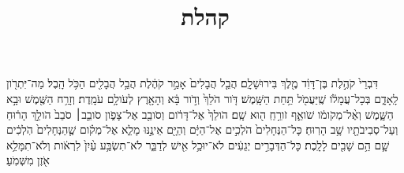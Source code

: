 \documentclass{openreader}
\title{קהלת}
\date{}
\begin{document}
\maketitle
\raggedbottom 
\fontsize{16pt}{24pt}\selectfont


דִּבְרֵי֙ קֹהֶ֣לֶת בֶּן־דָּוִ֔ד מֶ֖לֶךְ בִּירוּשָׁלִָֽם׃ 
הֲבֵ֤ל הֲבָלִים֙ אָמַ֣ר קֹהֶ֔לֶת הֲבֵ֥ל הֲבָלִ֖ים הַכֹּ֥ל הָֽבֶל׃ 
מַה־יִּתְרֹ֖ון לָֽאָדָ֑ם בְּכָל־עֲמָלֹ֔ו שֶֽׁיַּעֲמֹ֖ל תַּ֥חַת הַשָּֽׁמֶשׁ׃ 
דֹּ֤ור הֹלֵךְ֙ וְדֹ֣ור בָּ֔א וְהָאָ֖רֶץ לְעֹולָ֥ם עֹמָֽדֶת׃ 
וְזָרַ֥ח הַשֶּׁ֖מֶשׁ וּבָ֣א הַשָּׁ֑מֶשׁ וְאֶ֨ל־מְקֹומֹ֔ו שֹׁואֵ֛ף זֹורֵ֥חַֽ ה֖וּא שָֽׁם׃ 
הֹולֵךְ֙ אֶל־דָּרֹ֔ום וְסֹובֵ֖ב אֶל־צָפֹ֑ון סֹובֵ֤ב׀ סֹבֵב֙ הֹולֵ֣ךְ הָר֔וּחַ וְעַל־סְבִיבֹתָ֖יו שָׁ֥ב הָרֽוּחַ׃ 
כָּל־הַנְּחָלִים֙ הֹלְכִ֣ים אֶל־הַיָּ֔ם וְהַיָּ֖ם אֵינֶ֣נּוּ מָלֵ֑א אֶל־מְקֹ֗ום שֶׁ֤הַנְּחָלִים֙ הֹֽלְכִ֔ים שָׁ֛ם הֵ֥ם שָׁבִ֖ים לָלָֽכֶת׃ 
כָּל־הַדְּבָרִ֣ים יְגֵעִ֔ים לֹא־יוּכַ֥ל אִ֖ישׁ לְדַבֵּ֑ר לֹא־תִשְׂבַּ֥ע עַ֨יִן֙ לִרְאֹ֔ות וְלֹא־תִמָּלֵ֥א אֹ֖זֶן מִשְּׁמֹֽעַ׃ 
\end{document}
